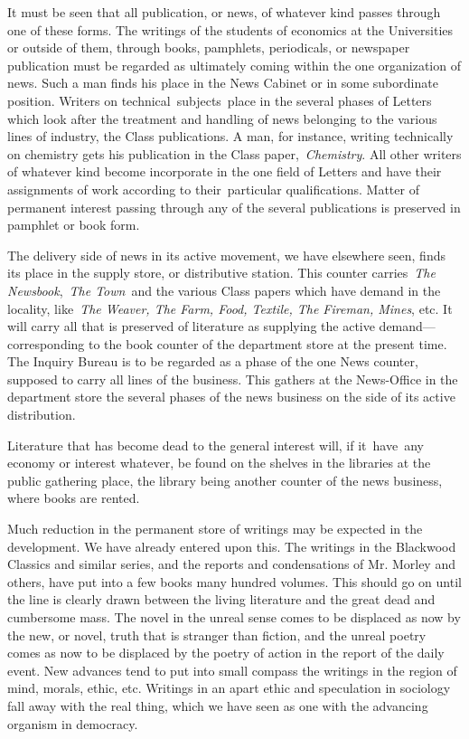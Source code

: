 \documentclass[twoside,symmetric,nobib,justified]{tufte-book}
\begin{document}
It must be seen that all publication, or news, of whatever kind passes
through one of these forms. The writings of the students of economics at
the Universities or outside of them, through books, pamphlets,
periodicals, or newspaper publication must be regarded as ultimately
coming within the one organization of news. Such a man finds his place
in the News Cabinet or in some subordinate position. Writers on
technical~subjects~place in the several phases of Letters which look
after the treatment and handling of news belonging to the various lines
of industry, the Class publications. A man, for instance, writing
technically on chemistry gets his publication in the Class
paper,~\emph{Chemistry}. All other writers of whatever kind become
incorporate in the one field of Letters and have their assignments of
work according to their~particular qualifications. Matter of permanent
interest passing through any of the several publications is preserved in
pamphlet or book form.~

The delivery side of news in its active movement, we have elsewhere
seen, finds its place in the supply store, or distributive station. This
counter carries~\emph{The Newsbook},~\emph{The Town}~and the various
Class papers which have demand in the locality, like~\emph{The Weaver,
The Farm, Food, Textile, The Fireman, Mines}, etc. It will carry all
that is preserved of literature as supplying the active
demand---corresponding to the book counter of the department store at
the present time. The Inquiry Bureau is to be regarded as a phase of the
one News counter, supposed to carry all lines of the business. This
gathers at the News-Office in the department store the several phases of
the news business on the side of its active distribution.~

Literature that has become dead to the general interest will, if
it~have~any economy or interest whatever, be found on the shelves in the
libraries at the public gathering place, the library being another
counter of the news business, where books are rented.~

Much reduction in the permanent store of writings may be expected in the
development. We have already entered upon this. The writings in the
Blackwood Classics and similar series, and the reports and condensations
of Mr. Morley and others, have put into a few books many hundred
volumes. This should go on until the line is clearly drawn between the
living literature and the great dead and cumbersome mass. The novel in
the unreal sense comes to be displaced as now by the new, or novel,
truth that is stranger than fiction, and the unreal poetry comes as now
to be displaced by the poetry of action in the report of the daily
event. New advances tend to put into small compass the writings in the
region of mind, morals, ethic, etc. Writings in an apart ethic and
speculation in sociology fall away with the real thing, which we have
seen as one with the advancing organism in democracy.~
\end{document}
